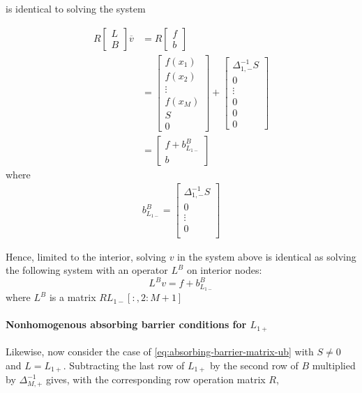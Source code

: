 \documentclass[11pt]{article}
\theoremstyle{definition}
\begin{document}
is identical to solving the system

\begin{align}
R\begin{bmatrix}
 L \\
 B
\end{bmatrix} 
\overline{v}
&= 
R\begin{bmatrix}
f \\
b
\end{bmatrix} \\
&= \begin{bmatrix}
f(x_1) \\
f(x_2) \\
\vdots \\
f(x_M) \\
S \\
0
\end{bmatrix} +
\begin{bmatrix}
\Delta_{1,-}^{-1}S \\
0  \\
\vdots \\ 
0 \\
0 \\
0
\end{bmatrix} \\
&= \begin{bmatrix}
f + b_{L_{1-}}^B \\
b
\end{bmatrix}
\end{align}
where 
\begin{align}
b_{L_{1-}}^B = 
\begin{bmatrix}
\Delta_{1,-}^{-1}S \\
0  \\
\vdots \\ 
0 \\
\end{bmatrix}
\end{align}

Hence, limited to the interior, solving $v$ in the system above is identical as solving the following system with an operator $L^B$ on interior nodes:
\begin{equation}
L^Bv= f + b_{L_{1-}}^B
\end{equation}
where $L^B$ is a matrix $RL_{1-}[:,2:M+1]$

\paragraph{Nonhomogenous absorbing barrier conditions for $L_{1+}$} Likewise, now consider the case of \cref{eq:absorbing-barrier-matrix-ub} with $S\neq 0$ and $L = L_{1+}$. Subtracting the last row of $L_{1+}$ by the second row of $B$ multiplied by $\Delta_{M,+}^{-1}$ gives, with the corresponding row operation matrix $R$, 
\end{document}
